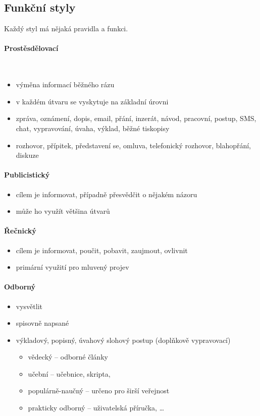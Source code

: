 \subsection{Funkční styly}
Každý styl má nějaká pravidla a funkci.
\paragraph{Prostěsdělovací}\mbox{}\\
\begin{itemize}
\item výměna informací běžného rázu
\item v každém útvaru se vyskytuje na základní úrovni
\item zpráva, oznámení, dopis, email, přání, inzerát, návod, pracovní, postup, SMS, chat, vypravování, úvaha, výklad, běžné tiskopisy
\item rozhovor, přípitek, představení se, omluva, telefonický rozhovor, blahopřání, diskuze
\end{itemize}

\paragraph{Publicistický}
\begin{itemize}
\item cílem je informovat, případně přesvědčit o nějakém názoru
\item může ho využít většina útvarů
\end{itemize}

\paragraph{Řečnický}
\begin{itemize}
\item cílem je informovat, poučit, pobavit, zaujmout, ovlivnit
\item primární využití pro mluvený projev
\end{itemize}

\paragraph{Odborný}
\begin{itemize}
\item vysvětlit
\item spisovně napsané
\item výkladový, popisný, úvahový slohový postup (doplňkově vypravovací)
\begin{itemize}
	\item vědecký -- odborné články
	\item učební -- učebnice, skripta, 
	\item populárně-naučný -- určeno pro širší veřejnost
	\item prakticky odborný -- uživatelská příručka, \ldots
\end{itemize}
\end{itemize}




